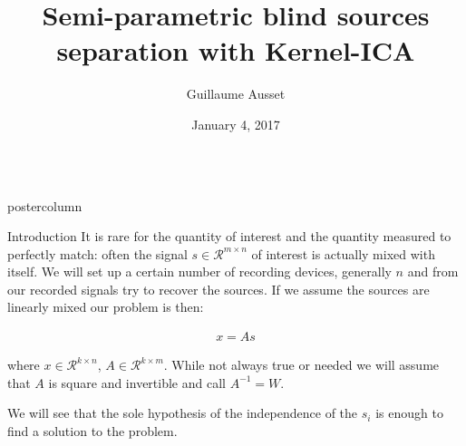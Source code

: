 \documentclass{beamer}
\title{Semi-parametric blind sources separation with \huge Kernel-ICA}
\author{Guillaume Ausset}
\institute[MASH]{Université Paris Dauphine}
\date{January 4, 2017}
\newlength{\columnheight}
\begin{document}
\begin{frame}
\begin{columns}
	\begin{column}{.5\textwidth}
		\begin{beamercolorbox}[center]{postercolumn}
			\begin{minipage}{.98\textwidth}  %
				\parbox[t][\columnheight]{\textwidth}{ %
					\begin{myblock}{Introduction}
					It is rare for the quantity of interest and the quantity measured to perfectly match: often the signal $s \in \mathcal{R}^{m \times n}$ of interest is actually mixed with itself. We will set up a certain number of recording devices, generally $n$ and from our recorded signals try to recover the sources. If we assume the sources are linearly mixed our problem is then:

						\begin{align*}
							x = A s
						\end{align*}

						where $x \in \mathcal{R}^{k \times n}$, $A \in \mathcal{R}^{k \times m}$. While not always true or needed we will assume that $A$ is square and invertible and call $A^{-1} = W$.

						We will see that the sole hypothesis of the independence of the $s_i$ is enough to find a solution to the problem.


\end{myblock}}
\end{minipage}
\end{beamercolorbox}
\end{column}
\end{columns}
\end{frame}
\end{document}
